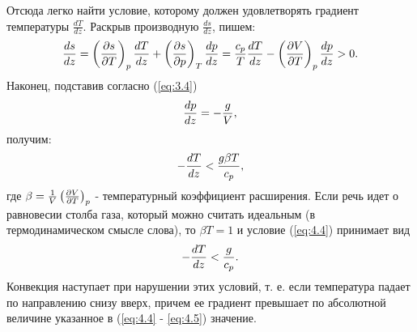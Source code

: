 Отсюда легко найти условие, которому должен удовлетворять градиент температуры
$\frac{dT}{dz}$. Раскрыв производную $\frac{ds}{dz}$, пишем:
\[
   \frac{d{s}}{d{z}}=\left( \frac{\partial{s}}{\partial{T}} \right)_{p}\frac{d{T}}{d{z}} + \left( \frac{\partial{s}}{\partial{p}} \right)_{T}\frac{d{p}}{d{z}} =
   \frac{c_p}{T}\frac{d{T}}{d{z}} - \left( \frac{\partial{V}}{\partial{T}} \right)_{p}\frac{d{p}}{d{z}} > 0.
\]
Наконец, подставив согласно (\ref{eq:3.4})
\[
   \frac{d{p}}{d{z}} = - \frac{g}{V},
\]
получим:
\begin{equation}
   \label{eq:4.4}
   - \frac{d{T}}{d{z}} < \frac{g \beta T}{c_p},
\end{equation}
где $\beta = \frac1{V}\left( \frac{\partial{V}}{\partial{T}} \right)_{p}$ - температурный коэффициент расширения.
Если речь идет о равновесии столба газа, который можно считать идеальным (в
термодинамическом смысле слова), то $\beta T = 1$ и условие (\ref{eq:4.4}) принимает вид
\begin{equation}
   \label{eq:4.5}
   - \frac{d{T}}{d{z}} < \frac{g}{c_p}.
\end{equation}
Конвекция наступает при нарушении этих условий, т. е. если температура падает по
направлению снизу вверх, причем ее градиент превышает по абсолютной величине
указанное в (\ref{eq:4.4} - \ref{eq:4.5}) значение.

